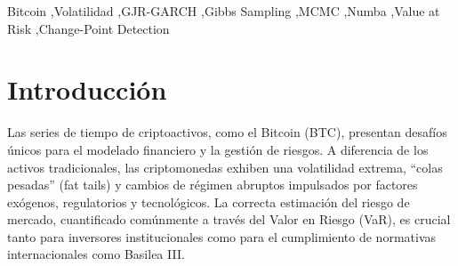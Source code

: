 \documentclass[
]{ceurart}
\begin{document}
\begin{abstract}
  Este proyecto investiga la dinámica de la volatilidad extrema en el mercado de Bitcoin (BTC-USD) durante el periodo 2019-2024. Se contrasta un enfoque econométrico robusto (GJR-GARCH con errores t-Student) frente a una metodología computacional intensiva basada en Inferencia Bayesiana (Change-Point Detection vía Gibbs Sampling). El diferenciador técnico reside en la optimización mediante compilación Just-In-Time (JIT) con Numba, logrando tiempos de inferencia competitivos, y el uso de Bootstrap de Bloques para validar supuestos distribucionales. Los resultados muestran que la implementación Bayesiana con estrategia de ventana móvil (Rolling Window) logra una adaptación dinámica comparable al modelo econométrico. Ambos modelos superaron la prueba de Kupiec, demostrando una calibración adecuada del riesgo de cola. Mientras el GJR-GARCH destaca por su eficiencia recursiva, el enfoque Bayesiano ofrece robustez mediante la re-estimación diaria de regímenes de volatilidad local.
\end{abstract}


\begin{keywords}
  Bitcoin \sep Volatilidad \sep GJR-GARCH \sep Gibbs Sampling \sep MCMC \sep Numba \sep Value at Risk \sep Change-Point Detection
\end{keywords}

\maketitle

\section{Introducción}

Las series de tiempo de criptoactivos, como el Bitcoin (BTC), presentan desafíos únicos para el modelado financiero y la gestión de riesgos. A diferencia de los activos tradicionales, las criptomonedas exhiben una volatilidad extrema, “colas pesadas” (fat tails) y cambios de régimen abruptos impulsados por factores exógenos, regulatorios y tecnológicos. La correcta estimación del riesgo de mercado, cuantificado comúnmente a través del Valor en Riesgo (VaR), es crucial tanto para inversores institucionales como para el cumplimiento de normativas internacionales como Basilea III.
\end{document}
